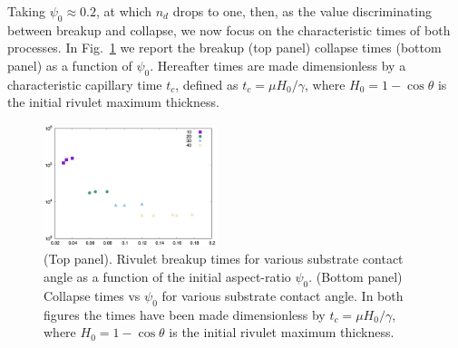 \documentclass[twoside,twocolumn,9pt]{article}
\begin{document}

Taking $\psi_0 \approx 0.2$, at which $n_d$ drops to one, then, as the 
value discriminating between breakup and collapse, we now focus on the 
characteristic times of both processes.
In Fig.~\ref{fig:timescaleDifference} we report the breakup (top panel) 
collapse times (bottom panel) as a function of $\psi_0$.
Hereafter times are made dimensionless by a characteristic capillary time $t_c$, defined as 
$t_c = \mu H_0/\gamma$, where $H_0=1-\cos \theta$ is the initial rivulet maximum thickness.
\begin{figure}
    \centering
    \includegraphics[width = 0.45\textwidth]{taub_vs_psi0.png}
    \caption{(Top panel). Rivulet breakup times for various substrate contact angle 
    as a function of the initial aspect-ratio $\psi_0$. (Bottom panel) Collapse times vs $\psi_0$ for various substrate contact angle. In both figures the times
    have been made dimensionless by $t_c = \mu H_0/\gamma$, 
    where $H_0=1-\cos \theta$ is the initial rivulet maximum thickness.}
    \label{fig:timescaleDifference}
\end{figure}
\end{document}
